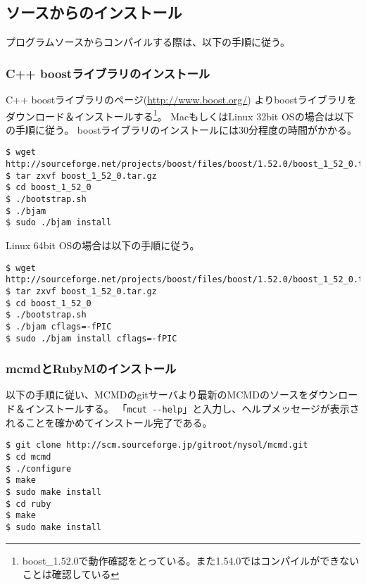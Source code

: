 \subsection{ソースからのインストール\label{sect:install_source}}
プログラムソースからコンパイルする際は、以下の手順に従う。

\subsubsection{C++ boostライブラリのインストール}

C++ boostライブラリのページ(\url{http://www.boost.org/})
よりboostライブラリをダウンロード＆インストールする\footnote{boost\_1.52.0で動作確認をとっている。また1.54.0ではコンパイルができないことは確認している}。
MacもしくはLinux 32bit OSの場合は以下の手順に従う。
boostライブラリのインストールには30分程度の時間がかかる。

\begin{Verbatim}[baselinestretch=0.7,frame=single]
$ wget http://sourceforge.net/projects/boost/files/boost/1.52.0/boost_1_52_0.tar.gz/download
$ tar zxvf boost_1_52_0.tar.gz
$ cd boost_1_52_0
$ ./bootstrap.sh
$ ./bjam
$ sudo ./bjam install
\end{Verbatim}

Linux 64bit OSの場合は以下の手順に従う。

\begin{Verbatim}[baselinestretch=0.7,frame=single]
$ wget http://sourceforge.net/projects/boost/files/boost/1.52.0/boost_1_52_0.tar.gz/download
$ tar zxvf boost_1_52_0.tar.gz
$ cd boost_1_52_0
$ ./bootstrap.sh
$ ./bjam cflags=-fPIC
$ sudo ./bjam install cflags=-fPIC
\end{Verbatim}

\subsubsection{mcmdとRubyMのインストール}
以下の手順に従い、MCMDのgitサーバより最新のMCMDのソースをダウンロード＆インストールする。
「\verb|mcut --help|」と入力し、ヘルプメッセージが表示されることを確かめてインストール完了である。

\begin{Verbatim}[baselinestretch=0.7,frame=single]
$ git clone http://scm.sourceforge.jp/gitroot/nysol/mcmd.git
$ cd mcmd
$ ./configure
$ make
$ sudo make install
$ cd ruby
$ make
$ sudo make install
\end{Verbatim}


%
